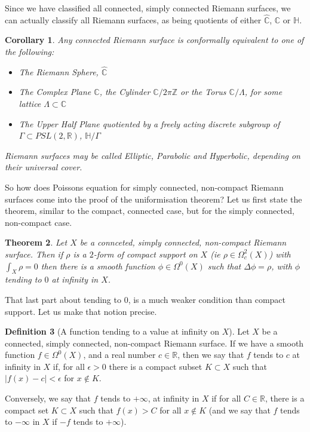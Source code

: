 \documentclass[11pt]{report}
\newtheorem{thm}{Theorem}[section]
\newtheorem{cor}[thm]{Corollary}
\theoremstyle{definition}
\newtheorem{defn}[thm]{Definition}
\begin{document}
Since we have classified all connected, simply connected Riemann surfaces, we can actually classify all Riemann surfaces, as being quotients of either $\widehat{\mathbb{C}}$, $\mathbb{C}$ or $\mathbb{H}$.

\begin{cor}
  Any connected Riemann surface is conformally equivalent to one of the following:
  \begin{itemize}
    \item The Riemann Sphere, $\widehat{\mathbb{C}}$
    \item The Complex Plane $\mathbb{C}$, the Cylinder $\mathbb{C}/2\pi \mathbb{Z}$ or the Torus $\mathbb{C}/\Lambda$, for some lattice $\Lambda \subset \mathbb{C}$
    \item The Upper Half Plane quotiented by a freely acting discrete subgroup of $\Gamma \subset PSL(2,\mathbb{R})$, $\mathbb{H}/\Gamma$ 
  \end{itemize}
  Riemann surfaces may be called Elliptic, Parabolic and Hyperbolic, depending on their universal cover.
\end{cor}
So how does Poissons equation for simply connected, non-compact Riemann surfaces come into the proof of the uniformisation theorem? Let us first state the theorem, similar to the compact, connected case, but for the simply connected, non-compact case.
\begin{thm}\label{NonCompactPoissons}
  Let $X$ be a connceted, simply connected, non-compact Riemann surface. Then if $\rho$ is a $2$-form of compact support on $X$ (ie $\rho \in \Omega^2_c(X)$) with $\int_X \rho = 0$ then there is a smooth function $\phi \in \Omega^0(X)$ such that $\Delta \phi = \rho$, with $\phi$ tending to $0$ at infinity in $X$.
\end{thm}
That last part about tending to $0$, is a much weaker condition than compact support. Let us make that notion precise.
\begin{defn}[A function tending to a value at infinity on $X$]
  Let $X$ be a connected, simply connected, non-compact Riemann surface. If we have a smooth function $f \in \Omega^0(X)$, and a real number $c \in \mathbb{R}$, then we say that $f$ tends to $c$ at infinity in $X$ if, for all $\epsilon > 0$ there is a compact subset $K \subset X$ such that $|f(x) - c| < \epsilon$ for $x \notin K$.

  Conversely, we say that $f$ tends to $+\infty$, at infinity in $X$ if for all $C \in \mathbb{R}$, there is a compact set $K \subset X$ such that $f(x) > C$ for all $x \notin K$ (and we say that $f$ tends to $-\infty$ in $X$ if $-f$ tends to $+\infty$).
\end{defn}
\end{document}
